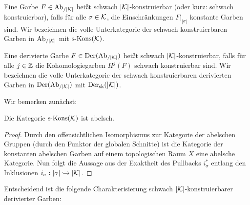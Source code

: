 
\begin{defn}
  Eine Garbe $F \in \operatorname{Ab}_{/|\mathcal{K}|}$ heißt schwach $|\mathcal{K}|$-konstruierbar (oder
  kurz: schwach konstruierbar), falls für alle $\sigma \in \mathcal{K}$, die
  Einschränkungen $F|_{|\sigma|}$ konstante Garben sind. Wir
  bezeichnen die volle Unterkategorie der schwach konstruierbaren
  Garben in $\operatorname{Ab}_{/|\mathcal{K}|}$ mit $\operatorname{s-Kons}(\mathcal{K})$.

  Eine derivierte Garbe $F \in \operatorname{Der}(\operatorname{Ab}_{/|\mathcal{K}|})$ heißt schwach
  $|\mathcal{K}|$-konstruierbar, falls für alle $j \in \mathbb{Z}$ die
  Kohomologiegarben $H^j(F)$ schwach konstruierbar sind. Wir
  bezeichnen die volle Unterkategorie der schwach konstruierbaren
  derivierten Garben in $\operatorname{Der}(\operatorname{Ab}_{/|\mathcal{K}|})$ mit $\operatorname{Der}_{\mathrm{sk}}(|\mathcal{K}|)$.
\end{defn}

Wir bemerken zunächst:

\begin{lemma}
  Die Kategorie $\operatorname{s-Kons}(\mathcal{K})$ ist abelsch.
\end{lemma}
\begin{proof}
  Durch den offensichtlichen Isomorphismus zur Kategorie der abelschen
  Gruppen (durch den Funktor der globalen Schnitte) ist die Kategorie
  der konstanten abelschen Garben auf einem topologischen Raum $X$
  eine abelsche Kategorie. Nun folgt die Aussage aus der Exaktheit des
  Pullbacks $i_{\sigma}^*$ entlang den Inklusionen $i_{\sigma}:
  |\sigma| \xhookrightarrow{} |\mathcal{K}|$.
\end{proof}

Entscheidend ist die folgende Charakterisierung schwach
$|\mathcal{K}|$-konstruierbarer derivierter Garben:


